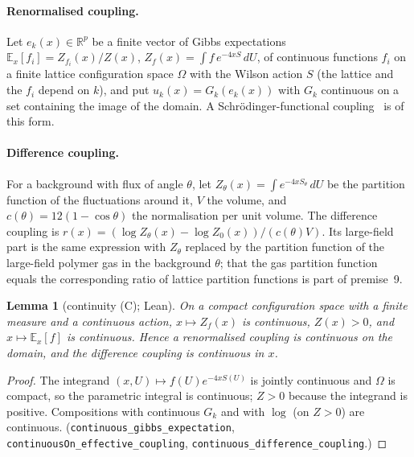 \documentclass[11pt,a4paper]{article}
\newtheorem{lemma}[theorem]{Lemma}
\theoremstyle{definition}
\theoremstyle{remark}
\newcommand{\E}{\mathbb{E}}
\newcommand{\lt}[1]{\texttt{#1}}
\begin{document}
\paragraph{Renormalised coupling.} Let $e_k(x)\in\mathbb R^p$ be a finite vector of Gibbs expectations $\E_x[f_i]=Z_{f_i}(x)/Z(x)$, $Z_f(x)=\int f\,e^{-4xS}\,dU$, of continuous functions $f_i$ on a finite lattice configuration space $\Omega$ with the Wilson action $S$ (the lattice and the $f_i$ depend on $k$), and put $u_k(x)=G_k(e_k(x))$ with $G_k$ continuous on a set containing the image of the domain. A Schrödinger-functional coupling~\cite{LNWW} is of this form.

\paragraph{Difference coupling.} For a background with flux of angle $\theta$, let $Z_\theta(x)=\int e^{-4xS_\theta}\,dU$ be the partition function of the fluctuations around it, $V$ the volume, and $c(\theta)=12(1-\cos\theta)$ the normalisation per unit volume. The difference coupling is $r(x)=(\log Z_\theta(x)-\log Z_0(x))/(c(\theta)V)$. Its large-field part is the same expression with $Z_\theta$ replaced by the partition function of the large-field polymer gas in the background $\theta$; that the gas partition function equals the corresponding ratio of lattice partition functions is part of premise~9.

\begin{lemma}[continuity (C); Lean]\label{lem:C}
On a compact configuration space with a finite measure and a continuous action, $x\mapsto Z_f(x)$ is continuous, $Z(x)>0$, and $x\mapsto\E_x[f]$ is continuous. Hence a renormalised coupling is continuous on the domain, and the difference coupling is continuous in $x$.
\end{lemma}
\begin{proof}
The integrand $(x,U)\mapsto f(U)e^{-4xS(U)}$ is jointly continuous and $\Omega$ is compact, so the parametric integral is continuous; $Z>0$ because the integrand is positive. Compositions with continuous $G_k$ and with $\log$ (on $Z>0$) are continuous. (\lt{continuous\_\allowbreak{}gibbs\_\allowbreak{}expectation}, \lt{continuousOn\_\allowbreak{}effective\_\allowbreak{}coupling}, \lt{continuous\_\allowbreak{}difference\_\allowbreak{}coupling}.)
\end{proof}
\end{document}
